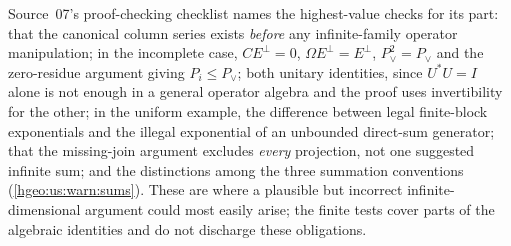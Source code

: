 \documentclass[11pt,letterpaper]{article}
\numberwithin{equation}{section}
\theoremstyle{definition}
\theoremstyle{remark}
\begin{document}
Source~07's proof-checking checklist names the highest-value checks for its
part: that the canonical column series exists \emph{before} any
infinite-family operator manipulation; in the incomplete case, $CE^\perp=0$,
$\Omega E^\perp=E^\perp$, $P_\vee^2=P_\vee$ and the zero-residue argument
giving $P_i\le P_\vee$; both unitary identities, since $U^*U=I$ alone is not
enough in a general operator algebra and the proof uses invertibility for the
other; in the uniform example, the difference between legal finite-block
exponentials and the illegal exponential of an unbounded direct-sum
generator; that the missing-join argument excludes \emph{every} projection,
not one suggested infinite sum; and the distinctions among the three
summation conventions (\cref{hgeo:us:warn:sums}). These are where a plausible
but incorrect infinite-dimensional argument could most easily arise; the
finite tests cover parts of the algebraic identities and do not discharge
these obligations.
\end{document}
